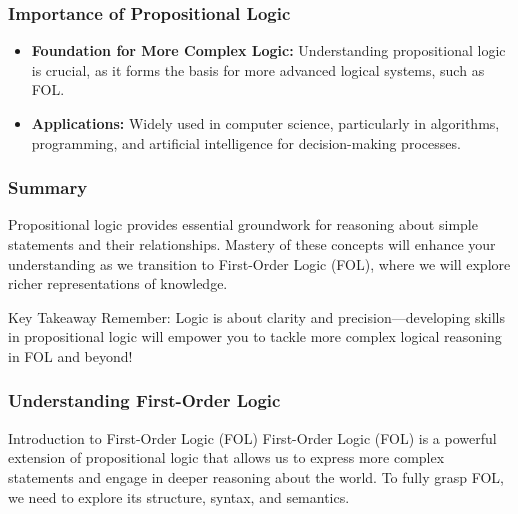 \documentclass[aspectratio=169]{beamer}
\begin{document}
\begin{frame}[fragile]
    \frametitle{Importance of Propositional Logic}
    \begin{itemize}
        \item \textbf{Foundation for More Complex Logic:} Understanding propositional logic is crucial, as it forms the basis for more advanced logical systems, such as FOL.
        \item \textbf{Applications:} Widely used in computer science, particularly in algorithms, programming, and artificial intelligence for decision-making processes.
    \end{itemize}
\end{frame}

\begin{frame}[fragile]
    \frametitle{Summary}
    Propositional logic provides essential groundwork for reasoning about simple statements and their relationships. Mastery of these concepts will enhance your understanding as we transition to First-Order Logic (FOL), where we will explore richer representations of knowledge.

    \begin{block}{Key Takeaway}
        Remember: Logic is about clarity and precision—developing skills in propositional logic will empower you to tackle more complex logical reasoning in FOL and beyond!
    \end{block}
\end{frame}

\begin{frame}[fragile]
    \frametitle{Understanding First-Order Logic}
    \begin{block}{Introduction to First-Order Logic (FOL)}
        First-Order Logic (FOL) is a powerful extension of propositional logic that allows us to express more complex statements and engage in deeper reasoning about the world. To fully grasp FOL, we need to explore its structure, syntax, and semantics.
    \end{block}
\end{frame}
\end{document}
